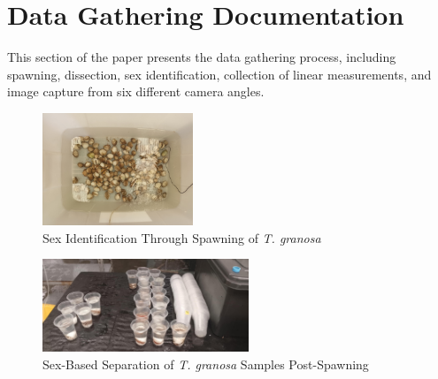 %
%
%                 

\chapter{Data Gathering Documentation}
\label{sec:appendixc}



%

This section of the paper presents the data gathering process, including spawning, dissection, sex identification, collection of linear measurements, and image capture from six different camera angles.


\begin{figure}[!htbp]
	\centering
	\includegraphics[width=0.4\textwidth, angle=90]{figures/spawning.jpg}
	\caption{Sex Identification Through Spawning of \textit{T. granosa}}
\end{figure}

\begin{figure}[!htbp]
	\centering
	\includegraphics[width=0.55\textwidth]{figures/spawning_separated.jpg}
	\caption{Sex-Based Separation of \textit{T. granosa} Samples Post-Spawning}
\end{figure}

